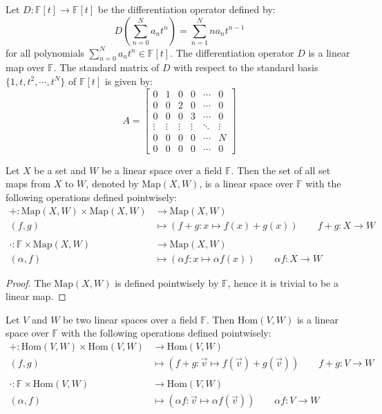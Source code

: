 \documentclass[
	11pt, %
	fleqn, %
	a4paper, %
]{LegrandOrangeBook}
\newcommand{\Hom}{\text{Hom}} %
\newcommand{\F}{\mathbb{F}} %
\newcommand{\Map}{\text{Map}} %
\begin{document}
\begin{example}
    Let $D: \F[t] \to \F[t]$ be the differentiation operator defined by:
    \[
        D\left( \sum_{n=0}^{N} a_n t^n \right) = \sum_{n=1}^{N} n a_n t^{n-1}
    \]
    for all polynomials $\sum_{n=0}^{N} a_n t^n \in \F[t]$. The differentiation operator $D$ is a linear map over $\F$. The standard matrix of $D$ with respect to the standard basis $\{1, t, t^2, \cdots, t^N\}$ of $\F[t]$ is given by:
    \[
        A = \begin{bmatrix}
            0 & 1 & 0 & 0 & \cdots & 0 \\
            0 & 0 & 2 & 0 & \cdots & 0 \\
            0 & 0 & 0 & 3 & \cdots & 0 \\
            \vdots & \vdots & \vdots & \vdots & \ddots & \vdots \\
            0 & 0 & 0 & 0 & \cdots & N \\
            0 & 0 & 0 & 0 & \cdots & 0
        \end{bmatrix}
    \]
\end{example}

\begin{proposition}
    Let $X$ be a set and $W$ be a linear space over a field $\F$. Then the set of all set maps from $X$ to $W$, denoted by $\Map(X, W)$, is a linear space over $\F$ with the following operations defined pointwisely:
    \[
        \begin{split}
            + : \Map(X, W) \times \Map(X, W) &\to \Map(X, W) \\
            (f,g) &\mapsto (f+g: x \mapsto f(x) + g(x)) \qquad f + g : X \to W \\ \\
            \cdot : \F \times \Map(X, W) &\to \Map(X, W) \\
            (\alpha,f) &\mapsto (\alpha f: x \mapsto \alpha f(x)) \qquad \alpha f : X \to W
        \end{split}
    \]
\end{proposition}

\begin{proof}
    The $\Map(X, W)$ is defined pointwisely by $\F$, hence it is trivial to be a linear map.
\end{proof}

\begin{proposition}
    Let $V$ and $W$ be two linear spaces over a field $\F$. Then $\Hom(V, W)$ is a linear space over $\F$ with the following operations defined pointwisely:
    \[
        \begin{split}
            + : \Hom(V, W) \times \Hom(V, W) &\to \Hom(V, W) \\
            (f,g) &\mapsto (f+g: \vec{v} \mapsto f(\vec{v}) + g(\vec{v})) \qquad f + g : V \to W \\ \\
            \cdot : \F \times \Hom(V, W) &\to \Hom(V, W) \\
            (\alpha,f) &\mapsto (\alpha f: \vec{v} \mapsto \alpha f(\vec{v})) \qquad \alpha f : V \to W
        \end{split}
    \]
\end{proposition}
\end{document}

